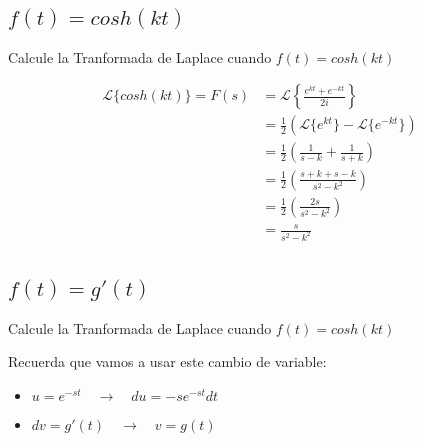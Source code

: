 \documentclass[12pt]{report}                                %
\begin{document}
        \subsection{$f(t) = cosh(kt)$}
            Calcule la Tranformada de Laplace cuando $f(t) = cosh(kt)$

            \begin{equation*}   
            \begin{split}
                \mathscr{L}\{cosh(kt)\}
                    = F(s) & = \mathscr{L}\left\{ \frac{e^{kt} + e^{-kt}}{2i} \right\}             \\
                    & = \frac{1}{2} \left(\mathscr{L}\{e^{kt}\}-\mathscr{L}\{e^{-kt}\}\right)      \\
                    & = \frac{1}{2} \left( \frac{1}{s-k} + \frac{1}{s+k} \right)                   \\
                    & = \frac{1}{2} \left( \frac{s+k+s-k}{s^2-k^2} \right)                         \\
                    & = \frac{1}{2} \left( \frac{2s}{s^2-k^2} \right)                              \\
                    & = \frac{s}{s^2-k^2}                                                          \\
            \end{split}
            \end{equation*}


        \clearpage
        \subsection{$f(t) = g'(t)$}
            Calcule la Tranformada de Laplace cuando $f(t) = cosh(kt)$

            Recuerda que vamos a usar este cambio de variable:
            \begin{itemize}
                \item $u=e^{-st} \quad \to \quad du=-se^{-st}dt$
                \item $dv=g'(t)  \quad \to \quad v =g(t)$ 
            \end{itemize}
\end{document}
